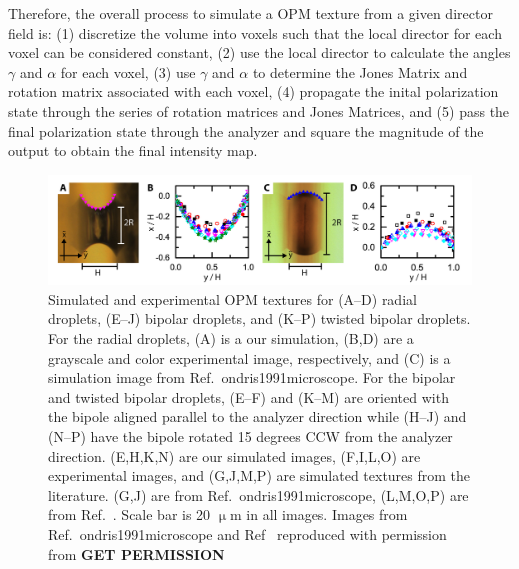 Therefore, the overall process to simulate a OPM texture from a given director field is: (1) discretize the volume into voxels such that the local director for each voxel can be considered constant, (2) use the local director to calculate the angles $\gamma$ and $\alpha$ for each voxel, (3) use $\gamma$ and $\alpha$ to determine the Jones Matrix and rotation matrix associated with each voxel, (4) propagate the inital polarization state through the series of rotation matrices and Jones Matrices, and (5) pass the final polarization state through the analyzer and square the magnitude of the output to obtain the final intensity map.
\begin{figure}
\centering
\includegraphics{figures/C5/Ch5-Figs_ShapeContour.png}
\caption{Simulated and experimental OPM textures for (A--D) radial droplets, (E--J) bipolar droplets, and (K--P) twisted bipolar droplets.
For the radial droplets, (A) is a our simulation, (B,D) are a grayscale and color experimental image, respectively, and (C) is a simulation image from Ref.~{ondris1991microscope}.
For the bipolar and twisted bipolar  droplets, (E--F) and (K--M) are oriented with the bipole aligned parallel to the analyzer direction while (H--J) and (N--P) have the bipole rotated 15 degrees CCW from the analyzer direction. (E,H,K,N) are our simulated images, (F,I,L,O) are experimental images, and (G,J,M,P) are simulated textures from the literature.
(G,J) are from Ref.~{ondris1991microscope}, (L,M,O,P) are from Ref.~\cite{RN193}.
Scale bar is 20 $\upmu$m in all images.
Images from Ref.~{ondris1991microscope} and Ref~\cite{RN193} reproduced with permission from {\bf GET PERMISSION}
}\label{f:4-spherecomparison}
\end{figure}

